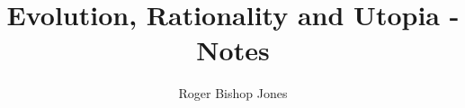 \documentclass[10pt,titlepage]{book}
\begin{document}
\author{Roger Bishop Jones}
\title{Evolution, Rationality and Utopia - Notes}
\maketitle
\tableofcontents
\end{document}
